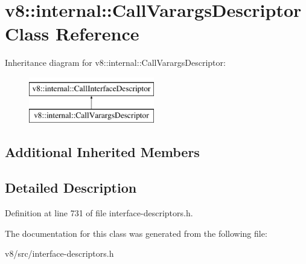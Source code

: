 \hypertarget{classv8_1_1internal_1_1CallVarargsDescriptor}{}\section{v8\+:\+:internal\+:\+:Call\+Varargs\+Descriptor Class Reference}
\label{classv8_1_1internal_1_1CallVarargsDescriptor}
Inheritance diagram for v8\+:\+:internal\+:\+:Call\+Varargs\+Descriptor\+:\begin{figure}[H]
\begin{center}
\leavevmode
\includegraphics[height=2.000000cm]{classv8_1_1internal_1_1CallVarargsDescriptor}
\end{center}
\end{figure}
\subsection*{Additional Inherited Members}


\subsection{Detailed Description}


Definition at line 731 of file interface-\/descriptors.\+h.



The documentation for this class was generated from the following file\+:\begin{DoxyCompactItemize}
\item 
v8/src/interface-\/descriptors.\+h\end{DoxyCompactItemize}
